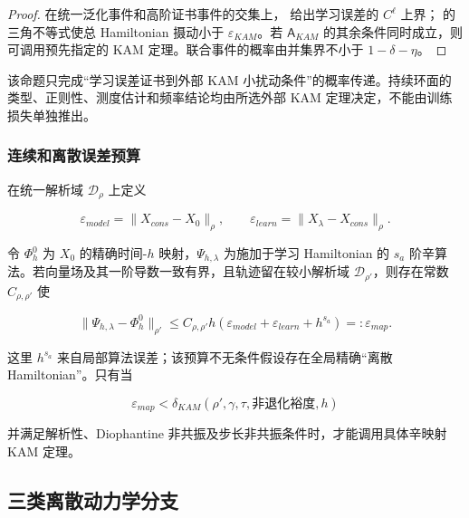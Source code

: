 \begin{proof} 在统一泛化事件和高阶证书事件的交集上， 给出学习误差的 \(C^{\ell}\) 上界； 的三角不等式使总 Hamiltonian 摄动小于 \(\varepsilon_{KAM}\)。若 \(\mathsf{A}_{KAM}\) 的其余条件同时成立，则可调用预先指定的 KAM 定理。联合事件的概率由并集界不小于 \(1 - \delta - \eta\)。\end{proof}

该命题只完成``学习误差证书到外部 KAM 小扰动条件''的概率传递。持续环面的类型、正则性、测度估计和频率结论均由所选外部 KAM 定理决定，不能由训练损失单独推出。

\subsubsection{连续和离散误差预算}\label{sec:chnn-4-6-8}

在统一解析域 \(\mathcal{D}_{\rho}\) 上定义

\begin{equation}
\label{eq:chnn-4-59}
\varepsilon_{model} = \parallel X_{cons} - X_{0} \parallel_{\rho},\quad\quad\varepsilon_{learn} = \parallel X_{\lambda} - X_{cons} \parallel_{\rho}.
\end{equation}

令 \(\Phi_{h}^{0}\) 为 \(X_{0}\) 的精确时间-\(h\) 映射，\(\Psi_{h,\lambda}\) 为施加于学习 Hamiltonian 的 \(s_{a}\) 阶辛算法。若向量场及其一阶导数一致有界，且轨迹留在较小解析域 \(\mathcal{D}_{\rho\prime}\)，则存在常数 \(C_{\rho,\rho\prime}\) 使

\begin{equation}
\label{eq:chnn-4-60}
\boxed{\parallel \Psi_{h,\lambda} - \Phi_{h}^{0} \parallel_{\rho\prime} \leq C_{\rho,\rho\prime}h\left( \varepsilon_{model} + \varepsilon_{learn} + h^{s_{a}} \right) = :\varepsilon_{map}.}
\end{equation}

这里 \(h^{s_{a}}\) 来自局部算法误差；该预算不无条件假设存在全局精确``离散 Hamiltonian''。只有当

\begin{equation}
\label{eq:chnn-4-61}
\varepsilon_{map} < \delta_{KAM}\left( \rho\prime,\gamma,\tau,\text{非退化裕度},h \right)
\end{equation}

并满足解析性、Diophantine 非共振及步长非共振条件时，才能调用具体辛映射 KAM 定理\cite{FengQin2010,Shang1999KAMAlgorithms,Shang2000KAMMappings,Poschel2001KAMLecture}。

\subsection{三类离散动力学分支}\label{sec:chnn-4-7}

